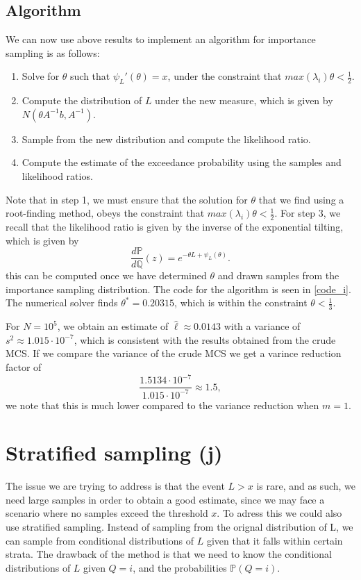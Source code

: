 \documentclass{article}
\begin{document}
\subsection{Algorithm}
We can now use above results to implement an algorithm for importance sampling is as follows:
\begin{enumerate}
    \item Solve for $\theta$ such that $\psi_L'(\theta) = x$, under the constraint that $max(\lambda_i)\theta < \frac{1}{2}$.
    \item Compute the distribution of $L$ under the new measure, which is given by $N(\theta A^{-1}b, A^{-1})$.
    \item Sample from the new distribution and compute the likelihood ratio.
    \item Compute the estimate of the exceedance probability using the samples and likelihood ratios.
\end{enumerate}
Note that in step 1, we must ensure that the solution for $\theta$ that we find using a root-finding method, obeys the constraint that $max(\lambda_i)\theta < \frac{1}{2}$.
For step 3, we recall that the likelihood ratio is given by the inverse of the exponential tilting, which is given by
\begin{equation*}
    \dfrac{d\mathbb{P}}{d \mathbb{Q}}(z) =  e^{-\theta L + \psi_L(\theta)}.
\end{equation*}
this can be computed once we have determined $\theta$ and drawn samples from the importance sampling distribution. The code for the algorithm is seen in \autoref{code_i}. The numerical solver finds $\theta^* = 0.20315$, which is within the constraint $\theta < \frac{1}{3}$. 

For $N=10^5$, we obtain an estimate of $\hat{\ell} \approx 0.0143$ with a variance of $s^2 \approx 1.015\cdot 10^{-7}$, which is consistent with the results obtained from the crude MCS. If we compare the variance of the crude MCS we get a varince reduction factor of
\begin{equation*}
    \dfrac{1.5134\cdot 10^{-7}}{1.015\cdot 10^{-7}} \approx 1.5,
\end{equation*}
we note that this is much lower compared to the variance reduction when $m = 1$.



\section{Stratified sampling (j)}
The issue we are trying to address is that the event $L > x$ is rare, and as such, we need large samples in order to obtain a good estimate, since we may face a scenario where no samples exceed the threshold $x$. To adress this we could also use stratified sampling. Instead of sampling from the orignal distribution of L, we can sample from conditional distributions of 
$L$ given that it falls within certain strata. The drawback of the method is that we need to know the conditional distributions of $L$ given $Q = i$, and the probabilities $\mathbb{P}(Q = i)$. \vspace{.5cm}
\end{document}
